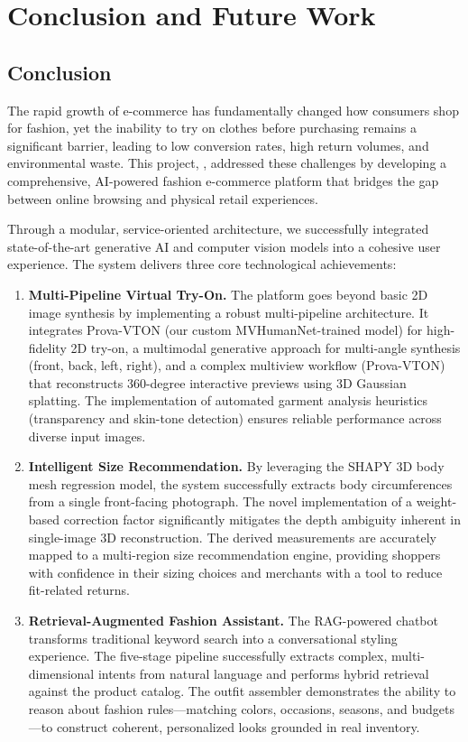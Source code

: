 \chapter{Conclusion and Future Work}

\section{Conclusion}
\label{sec:conclusion}

The rapid growth of e-commerce has fundamentally changed how consumers shop for fashion, yet the inability to try on clothes before purchasing remains a significant barrier, leading to low conversion rates, high return volumes, and environmental waste. This project, \projectname, addressed these challenges by developing a comprehensive, AI-powered fashion e-commerce platform that bridges the gap between online browsing and physical retail experiences.

Through a modular, service-oriented architecture, we successfully integrated state-of-the-art generative AI and computer vision models into a cohesive user experience. The system delivers three core technological achievements:

\begin{enumerate}[leftmargin=*]
    \item \textbf{Multi-Pipeline Virtual Try-On.} The platform goes beyond basic 2D image synthesis by implementing a robust multi-pipeline architecture. It integrates Prova-VTON (our custom MVHumanNet-trained model) for high-fidelity 2D try-on, a multimodal generative approach for multi-angle synthesis (front, back, left, right), and a complex multiview workflow (Prova-VTON) that reconstructs 360-degree interactive previews using 3D Gaussian splatting. The implementation of automated garment analysis heuristics (transparency and skin-tone detection) ensures reliable performance across diverse input images.

    \item \textbf{Intelligent Size Recommendation.} By leveraging the SHAPY 3D body mesh regression model, the system successfully extracts body circumferences from a single front-facing photograph. The novel implementation of a weight-based correction factor significantly mitigates the depth ambiguity inherent in single-image 3D reconstruction. The derived measurements are accurately mapped to a multi-region size recommendation engine, providing shoppers with confidence in their sizing choices and merchants with a tool to reduce fit-related returns.

    \item \textbf{Retrieval-Augmented Fashion Assistant.} The RAG-powered chatbot transforms traditional keyword search into a conversational styling experience. The five-stage pipeline successfully extracts complex, multi-dimensional intents from natural language and performs hybrid retrieval against the product catalog. The outfit assembler demonstrates the ability to reason about fashion rules—matching colors, occasions, seasons, and budgets—to construct coherent, personalized looks grounded in real inventory.
\end{enumerate}

